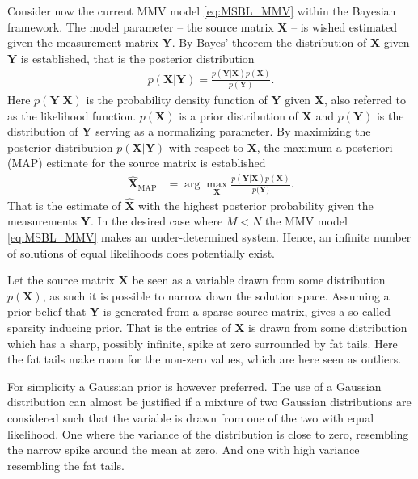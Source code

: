 Consider now the current MMV model \eqref{eq:MSBL_MMV} within the Bayesian framework. The model parameter -- the source matrix $\mathbf{X}$ -- is wished estimated given the measurement matrix $\mathbf{Y}$. 
By Bayes' theorem the distribution of $\mathbf{X}$ given $\mathbf{Y}$ is established, that is the posterior distribution 
\begin{align*}
p(\mathbf{X}|\mathbf{Y}) = \frac{p(\mathbf{Y}|\mathbf{X}) p(\mathbf{X})}{p(\mathbf{Y})}.
\end{align*} 
Here $p(\mathbf{Y}|\mathbf{X})$ is the probability density function of $\mathbf{Y}$ given $\mathbf{X}$, also referred to as the likelihood function. $p(\mathbf{X})$ is a prior distribution of $\mathbf{X}$ and $p(\mathbf{Y})$ is the distribution of $\mathbf{Y}$ serving as a normalizing parameter.
By maximizing the posterior distribution $p(\mathbf{X}|\mathbf{Y})$ with respect to $\mathbf{X}$, the maximum a posteriori (MAP) estimate for the source matrix is established
\begin{align*}
\hat{\mathbf{X}}_{\text{MAP}} &= \arg \max_{\mathbf{X}} \frac{p(\mathbf{Y} \vert \mathbf{X}) p(\mathbf{X})}{p(\mathbf{Y)}}.
\end{align*}
That is the estimate of $\hat{\mathbf{X}}$ with the highest posterior probability given the measurements $\mathbf{Y}$. 
In the desired case where $M < N$ the MMV model \eqref{eq:MSBL_MMV} makes an under-determined system. 
Hence, an infinite number of solutions of equal likelihoods does potentially exist.  

Let the source matrix $\mathbf{X}$ be seen as a variable drawn from some distribution $p(\mathbf{X})$, as such it is possible to narrow down the solution space. 
Assuming a prior belief that $\mathbf{Y}$ is generated from a sparse source matrix, gives a so-called sparsity inducing prior. 
That is the entries of $\mathbf{X}$ is drawn from some distribution which has a sharp, possibly infinite, spike at zero surrounded by fat tails. Here the fat tails make room for the non-zero values, which are here seen as outliers.

For simplicity a Gaussian prior is however preferred. 
The use of a Gaussian distribution can almost be justified if a mixture of two Gaussian distributions are considered such that the variable is drawn from one of the two with equal likelihood. 
One where the variance of the distribution is close to zero, resembling the narrow spike around the mean at zero. 
And one with high variance resembling the fat tails.       

